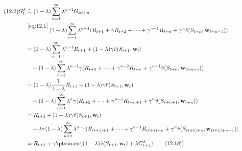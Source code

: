 \begin{solution}
\begin{align} \label{eq:12.2} \tag{12.2}
    G_t^\lambda
    & \doteq
    (1 - \lambda)
    \sum_{n=1}^\infty
        \lambda^{n-1}
        G_{t:t+n} \\
    & \stackrel
    {
        \eqref{eq:12.1}
    }{=}
    (1 - \lambda)
    \sum_{n=1}^\infty
        \lambda^{n-1}
        (R_{t+1} + \gamma R_{t+2} + \cdots + \gamma^{n-1} R_{t+n} + \gamma^n \hat v(S_{t+n}, \mathbf w_{t+n-1})) \notag \\
    & =
    (1 - \lambda)
    \sum_{n=1}^\infty
        \lambda^{n-1}
        R_{t+1}
    +
    (1 - \lambda) \gamma \hat v(S_{t+1}, \mathbf w_t) \notag \\
    & \quad +
    (1 - \lambda)
    \sum_{n=2}^\infty
        \lambda^{n-1}
        \gamma
        (R_{t+2} + \cdots + \gamma^{n-2} R_{t+n} + \gamma^{n-1} \hat v(S_{t+n}, \mathbf w_{t+n-1})) \notag \\
    & =
    (1 - \lambda)
    \frac{1}{1 - \lambda}
    R_{t+1}
    +
    (1 - \lambda) \gamma \hat v(S_{t+1}, \mathbf w_t) \notag \\
    & \quad +
    (1 - \lambda)
    \sum_{n=1}^\infty
        \lambda^n
        \gamma
        (R_{t+2} + \cdots + \gamma^{n-1} R_{t+n+1} + \gamma^n \hat v(S_{t+n+1}, \mathbf w_{t+n})) \notag \\
    & =
    R_{t+1}
    +
    (1 - \lambda) \gamma \hat v(S_{t+1}, \mathbf w_t) \notag \\
    & \quad +
    \lambda
    \gamma
    (1 - \lambda)
    \sum_{n=1}^\infty
        \lambda^{n-1}
        (R_{(t+1)+1} + \cdots + \gamma^{n-1} R_{(t+1)+n} + \gamma^n \hat v(S_{(t+1)+n}, \mathbf w_{(t+1)+n-1})) \notag \\
    & =
    R_{t+1} + \gamma \pbraces{(1 - \lambda) \hat v(S_{t+1}, \mathbf w_t) + \lambda G_{t+1}^\lambda} \tag{12.18$^\prime$}
\end{align}

\end{solution}


